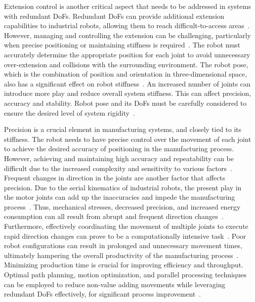 Extension control is another critical aspect that needs to be addressed in systems with redundant \acrshort{DoF}s. Redundant \acrshort{DoF}s can provide additional extension capabilities to industrial robots, allowing them to reach difficult-to-access areas~\cite{Duong.2021}. However, managing and controlling the extension can be challenging, particularly when precise positioning or maintaining stiffness is required~\cite{Lin.2022}.
The robot must accurately determine the appropriate position for each joint to avoid unnecessary over-extension and collisions with the surrounding environment. The robot pose, which is the combination of position and orientation in three-dimensional space, also has a significant effect on robot stiffness~\cite{Xiong.2019}. An increased number of joints can introduce more play and reduce overall system stiffness. This can affect precision, accuracy and stability. Robot pose and its \acrshort{DoF}s must be carefully considered to ensure the desired level of system rigidity~\cite{Wang.2022, Shi.2021}.


Precision is a crucial element in manufacturing systems, and closely tied to its stiffness. The robot needs to have precise control over the movement of each joint to achieve the desired accuracy of positioning in the manufacturing process. However, achieving and maintaining high accuracy and repeatability can be difficult due to the increased complexity and sensitivity to various factors~\cite{Duong.2021}. %
Frequent changes in direction in the joints are another factor that affects precision. 
Due to the serial kinematics of industrial robots, the present play in the motor joints can add up the inaccuracies and impede the manufacturing process~\cite{Huynh.2020, ChenGang.2014}. Thus, mechanical stresses, decreased precision, and increased energy consumption can all result from abrupt and frequent direction changes~\cite{Gasparetto.2010}. Furthermore, effectively coordinating the movement of multiple joints to execute rapid direction changes can prove to be a computationally intensive task~\cite{VandeWeghe.2007}. Poor robot configurations can result in prolonged and unnecessary movement times, ultimately hampering the overall productivity of the manufacturing process~\cite{Reiter.2016}. %
Minimizing production time is crucial for improving efficiency and throughput. Optimal path planning, motion optimization, and parallel processing techniques can be employed to reduce non-value adding movements while leveraging redundant \acrshort{DoF}s effectively, for significant process improvement~\cite{Boscariol.2020}.




